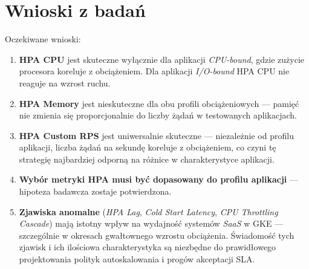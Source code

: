 \section{Wnioski z badań}


Oczekiwane wnioski:

\begin{enumerate}
  \item \textbf{HPA CPU} jest skuteczne wyłącznie dla aplikacji \textit{CPU-bound}, gdzie zużycie procesora koreluje z obciążeniem. Dla aplikacji \textit{I/O-bound} HPA CPU nie reaguje na wzrost ruchu.

  \item \textbf{HPA Memory} jest nieskuteczne dla obu profili obciążeniowych — pamięć nie zmienia się proporcjonalnie do liczby żądań w testowanych aplikacjach.

  \item \textbf{HPA Custom RPS} jest uniwersalnie skuteczne — niezależnie od profilu aplikacji, liczba żądań na sekundę koreluje z obciążeniem, co czyni tę strategię najbardziej odporną na różnice w charakterystyce aplikacji.

  \item \textbf{Wybór metryki HPA musi być dopasowany do profilu aplikacji} — hipoteza badawcza zostaje potwierdzona.

  \item \textbf{Zjawiska anomalne} (\textit{HPA Lag}, \textit{Cold Start Latency}, \textit{CPU Throttling Cascade}) mają istotny wpływ na wydajność systemów \textit{SaaS} w GKE — szczególnie w okresach gwałtownego wzrostu obciążenia. Świadomość tych zjawisk i ich ilościowa charakterystyka są niezbędne do prawidłowego projektowania polityk autoskalowania i progów akceptacji SLA.
\end{enumerate}
